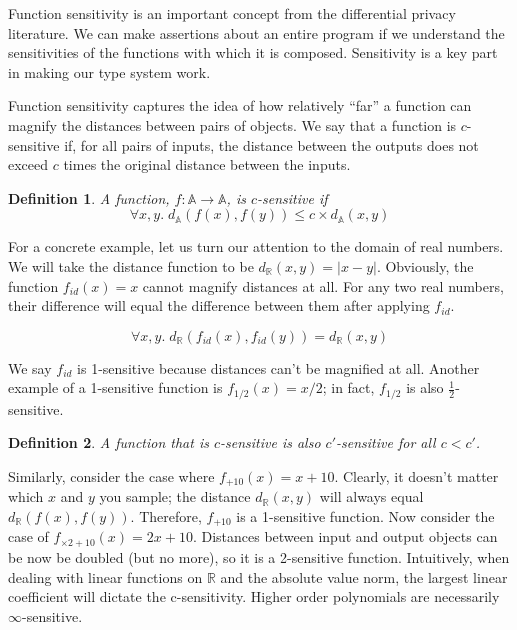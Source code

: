 \documentclass[12pt]{article}
\newtheorem{defn}{Definition}[section]
\begin{document}
Function sensitivity is an important concept from the differential privacy literature.
We can make assertions about an entire program if we understand the sensitivities of the functions with which it is composed.
Sensitivity is a key part in making our type system work.

Function sensitivity captures the idea of how relatively ``far'' a function can magnify the distances between pairs of objects.
We say that a function is $c$-sensitive if, for all pairs of inputs, the distance between the outputs does not exceed $c$ times the original distance between the inputs.

\begin{defn}\label{def:csens}
  A function, $f : \mathbb A \rightarrow \mathbb A$, is $c$-sensitive if
  $$\forall x,y.\; d_{\mathbb A}(f(x),f(y)) \le c \times d_{\mathbb A}(x,y)$$
\end{defn}

For a concrete example, let us turn our attention to the domain of real numbers.
We will take the distance function to be $d_\mathbb{R}(x,y) = |x - y|$.
Obviously, the function $f_{id}(x)=x$ cannot magnify distances at all.
For any two real numbers, their difference will equal the difference between them after applying $f_{id}$.

\[
  \forall x,y.\; d_\mathbb{R}(f_{id}(x),f_{id}(y)) = d_\mathbb{R}(x,y)
\]

We say $f_{id}$ is 1-sensitive because distances can't be magnified at all.
Another example of a 1-sensitive function is $f_{1/2}(x) = x/2$; in fact, $f_{1/2}$ is also $\frac{1}{2}$-sensitive.

\begin{defn}\label{def:clessthancprime}
  A function that is $c$-sensitive is also $c'$-sensitive for all $c < c'$.
\end{defn}

Similarly, consider the case where $f_{+10}(x) = x + 10$.
Clearly, it doesn't matter which $x$ and $y$ you sample; the distance $d_{\mathbb R}(x,y)$ will always equal $d_{\mathbb R}(f(x),f(y))$.
Therefore, $f_{+10}$ is a 1-sensitive function.
Now consider the case of $f_{\times 2+10}(x) = 2x + 10$.
Distances between input and output objects can be now be doubled (but no more), so it is a 2-sensitive function.
Intuitively, when dealing with linear functions on $\mathbb R$ and the absolute value norm, the largest linear coefficient will dictate the c-sensitivity.
Higher order polynomials are necessarily $\infty$-sensitive.
\end{document}
